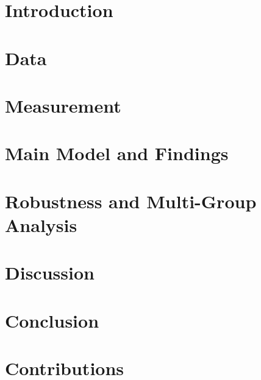 \documentclass[12pt]{article}
\begin{document}
\section{Introduction}
\label{intro}

\newpage

\section{Data}
\label{data}

\newpage

\section{Measurement}
\label{measurement}

\newpage

\section{Main Model and Findings}
\label{model}

\newpage

\section{Robustness and Multi-Group Analysis}
\label{robustness}

\newpage

\section{Discussion}
\label{discussion}

\newpage

\section{Conclusion}
\label{conclusion}


\newpage


\section*{Contributions}
\label{contributions}

\newpage
\end{document}
